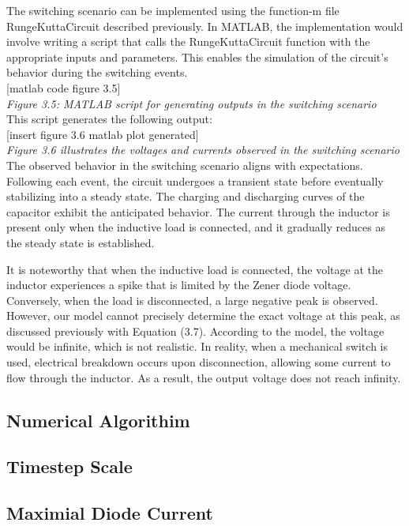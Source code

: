 The switching scenario can be implemented using the function-m file RungeKuttaCircuit described previously. In MATLAB, the implementation would involve writing a script that calls the RungeKuttaCircuit function with the appropriate inputs and parameters. This enables the simulation of the circuit's behavior during the switching events.\\

[matlab code figure 3.5]\\

\emph{Figure 3.5: MATLAB script for generating outputs in the switching scenario}\\

This script generates the following output:\\

[insert figure 3.6 matlab plot generated]\\

\emph{Figure 3.6 illustrates the voltages and currents observed in the switching scenario}\\

The observed behavior in the switching scenario aligns with expectations. Following each event, the circuit undergoes a transient state before eventually stabilizing into a steady state. The charging and discharging curves of the capacitor exhibit the anticipated behavior. The current through the inductor is present only when the inductive load is connected, and it gradually reduces as the steady state is established.

It is noteworthy that when the inductive load is connected, the voltage at the inductor experiences a spike that is limited by the Zener diode voltage. Conversely, when the load is disconnected, a large negative peak is observed. However, our model cannot precisely determine the exact voltage at this peak, as discussed previously with Equation (3.7). According to the model, the voltage would be infinite, which is not realistic. In reality, when a mechanical switch is used, electrical breakdown occurs upon disconnection, allowing some current to flow through the inductor. As a result, the output voltage does not reach infinity.\\



























\subsection{Numerical Algorithim}
\subsection{Timestep Scale}
\subsection{Maximial Diode Current}
\fi